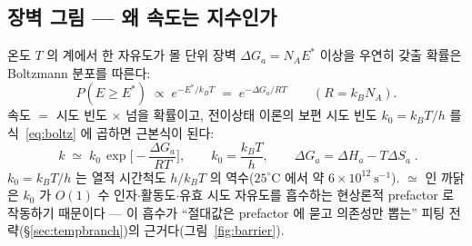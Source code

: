 \documentclass[11pt,a4paper]{article}
\begin{document}
\subsection{장벽 그림 — 왜 속도는 지수인가}
온도 $T$ 의 계에서 한 자유도가 몰 단위 장벽 $\Delta G_a=N_AE^*$ 이상을 우연히 갖출 확률은 Boltzmann 분포를 따른다:
\begin{equation}
P(E\ge E^*)\;\propto\;e^{-E^*/k_BT}
\;=\;e^{-\Delta G_a/RT}\qquad(R=k_BN_A).
\label{eq:boltz}
\end{equation}
속도 $=$ 시도 빈도 $\times$ 넘을 확률이고, 전이상태 이론의 보편 시도 빈도 $k_0=k_BT/h$ 를 식~\eqref{eq:boltz} 에 곱하면 \cite{eyring1935} 근본식이 된다:
\begin{equation}
\boxed{\;k\;\simeq\;k_0\,\exp\!\Big[-\frac{\Delta G_a}{RT}\Big],\qquad
k_0=\frac{k_BT}{h},\qquad \Delta G_a=\Delta H_a-T\Delta S_a\;.}
\label{eq:eyring}
\end{equation}
$k_0=k_BT/h$ 는 열적 시간척도 $h/k_BT$ 의 역수($25^\circ$C 에서 약 $6\times10^{12}\ \mathrm{s^{-1}}$). $\simeq$ 인 까닭은 $k_0$ 가 $O(1)$ 수 인자$\cdot$활동도$\cdot$유효 시도 자유도를 흡수하는 현상론적 prefactor 로 작동하기 때문이다 — 이 흡수가 ``절대값은 prefactor 에 묻고 의존성만 뽑는'' 피팅 전략(\S\ref{sec:tempbranch})의 근거다(그림~\ref{fig:barrier}).
\end{document}
